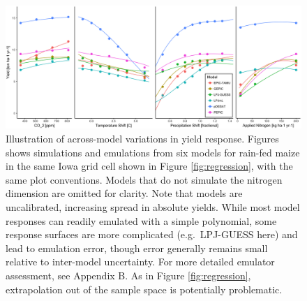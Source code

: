 \documentclass[esd, final]{copernicus} %
\begin{document}
\begin{figure}[h]
\centering
    \includegraphics[width=16cm]{figures/regression_model.png}
    \caption{Illustration of across-model variations in yield response. Figures shows simulations and emulations from six models for rain-fed maize in the same Iowa grid cell shown in Figure \ref{fig:regression}, with the same plot conventions. Models that do not simulate the nitrogen dimension are omitted for clarity. Note that models are uncalibrated, increasing spread in absolute yields.
While most model responses can readily emulated with a simple polynomial, some response surfaces are more complicated (e.g.\  LPJ-GUESS here) and lead to emulation error, though error generally remains small relative to inter-model uncertainty. For more detailed emulator assessment, see Appendix B. As in Figure \ref{fig:regression}, extrapolation out of the sample space is potentially problematic.}
   \label{fig:regression_iowa}
\end{figure}
\end{document}
